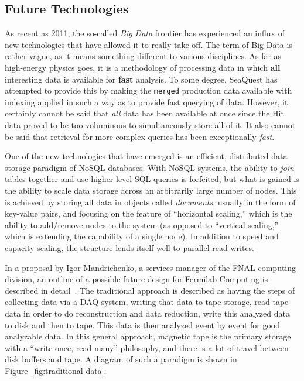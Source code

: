 \subsection{Future Technologies}

As recent as 2011, the so-called \emph{Big Data} frontier has experienced an influx of new technologies that have allowed it to really take off. The term of Big Data is rather vague, as it means something different to various disciplines. As far as high-energy physics goes, it is a methodology of processing data in which \textbf{all} interesting data is available for \textbf{fast} analysis. To some degree, SeaQuest has attempted to provide this by making the \verb|merged| production data available with indexing applied in such a way as to provide fast querying of data. However, it certainly cannot be said that \emph{all} data has been available at once since the Hit data proved to be too voluminous to simultaneously store all of it. It also cannot be said that retrieval for more complex queries has been exceptionally \emph{fast}.

One of the new technologies that have emerged is an efficient, distributed data storage paradigm of NoSQL databases. With NoSQL systems, the ability to \emph{join} tables together and use higher-level SQL queries is forfeited, but what is gained is the ability to scale data storage across an arbitrarily large number of nodes. This is achieved by storing all data in objects called \emph{documents}, usually in the form of key-value pairs, and focusing on the feature of ``horizontal scaling,'' which is the ability to add/remove nodes to the system (as opposed to ``vertical scaling,'' which is extending the capability of a single node). In addition to speed and capacity scaling, the structure lends itself well to parallel read-writes.

In a proposal by Igor Mandrichenko, a services manager of the FNAL computing division, an outline of a possible future design for Fermilab Computing is described in detail~\cite{igor:bigdata}. The traditional approach is described as having the steps of collecting data via a DAQ system, writing that data to tape storage, read tape data in order to do reconstruction and data reduction, write this analyzed data to disk and then to tape. This data is then analyzed event by event for good analyzable data. In this general approach, magnetic tape is the primary storage with a ``write once, read many'' philosophy, and there is a lot of travel between disk buffers and tape. A diagram of such a paradigm is shown in Figure~\ref{fig:traditional-data}. 

